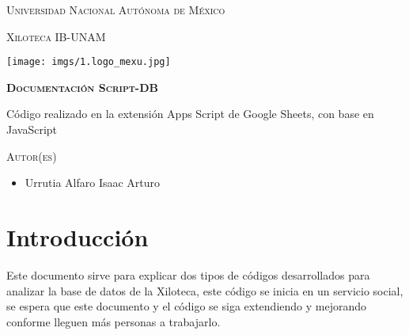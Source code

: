 \documentclass[12pt]{article} %
\begin{document}
    \begin{titlepage}
        \centering
        {\scshape\LARGE Universidad Nacional Autónoma de México \par}
    
        \vspace{0.5cm}
        {\scshape\Large Xiloteca IB-UNAM\par}
        \texttt{[image: imgs/1.logo\_mexu.jpg]}

        \vspace{2 cm}
        {\scshape\Large \textbf{Documentación Script-DB} \par}

        \vspace{2.5 cm}
        {\large {Código realizado en la extensión Apps Script de Google Sheets, con base en JavaScript} \par}
            
        \vspace{4 cm}

        {\scshape \large Autor(es) \par} %

        \begin{center}
            \begin{itemize}
                \centering
                \item Urrutia Alfaro Isaac Arturo 
            \end{itemize}
        \end{center}

        
        \vfill
    \end{titlepage}

    \newpage

    \hypertarget{toc}{}
    \tableofcontents {}



    \newpage

    \section* {Introducción}
    Este documento sirve para explicar dos tipos de códigos desarrollados para analizar la base de datos de la Xiloteca, este código se inicia en un servicio social, se espera que este documento y el código se siga extendiendo y mejorando conforme lleguen más personas a trabajarlo. \\
\end{document}
